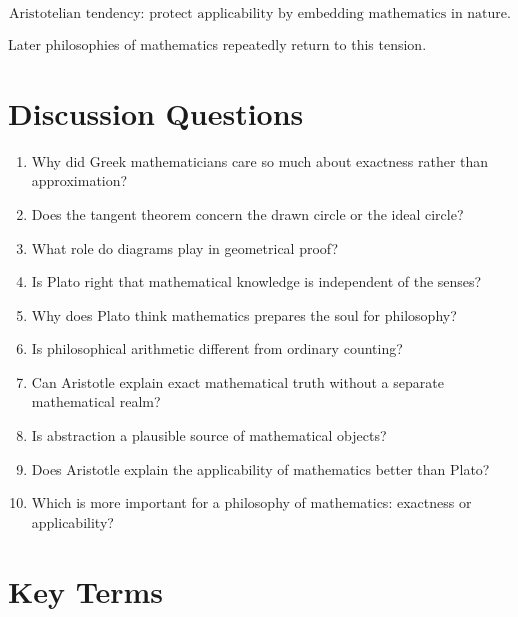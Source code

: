 \documentclass[11pt]{article}
\begin{document}
\[
\boxed{
\text{Aristotelian tendency: protect applicability by embedding mathematics in nature.}
}
\]

Later philosophies of mathematics repeatedly return to this tension.

\section*{Discussion Questions}

\begin{enumerate}[leftmargin=2em]
    \item Why did Greek mathematicians care so much about exactness rather than approximation?
    \item Does the tangent theorem concern the drawn circle or the ideal circle?
    \item What role do diagrams play in geometrical proof?
    \item Is Plato right that mathematical knowledge is independent of the senses?
    \item Why does Plato think mathematics prepares the soul for philosophy?
    \item Is philosophical arithmetic different from ordinary counting?
    \item Can Aristotle explain exact mathematical truth without a separate mathematical realm?
    \item Is abstraction a plausible source of mathematical objects?
    \item Does Aristotle explain the applicability of mathematics better than Plato?
    \item Which is more important for a philosophy of mathematics: exactness or applicability?
\end{enumerate}

\section*{Key Terms}
\end{document}
